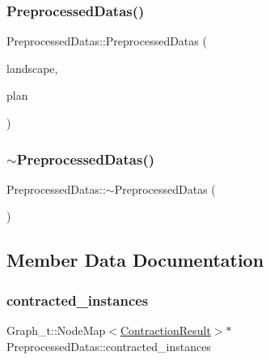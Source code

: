 \subsubsection{\texorpdfstring{Preprocessed\+Datas()}{PreprocessedDatas()}}
{\footnotesize\ttfamily Preprocessed\+Datas\+::\+Preprocessed\+Datas (\begin{DoxyParamCaption}\item[{const \hyperlink{class_landscape}{Landscape} \&}]{landscape,  }\item[{const \hyperlink{class_restoration_plan}{Restoration\+Plan} \&}]{plan }\end{DoxyParamCaption})\hspace{0.3cm}{\ttfamily [inline]}}

\mbox{\label{class_preprocessed_datas_a9bb50e07b35810a18b2a1890b5e456c1}} 
\subsubsection{\texorpdfstring{$\sim$\+Preprocessed\+Datas()}{~PreprocessedDatas()}}
{\footnotesize\ttfamily Preprocessed\+Datas\+::$\sim$\+Preprocessed\+Datas (\begin{DoxyParamCaption}{ }\end{DoxyParamCaption})\hspace{0.3cm}{\ttfamily [inline]}}



\subsection{Member Data Documentation}
\mbox{\label{class_preprocessed_datas_ab5f37f8788618675ab08bb46f8e5ac81}} 
\subsubsection{\texorpdfstring{contracted\+\_\+instances}{contracted\_instances}}
{\footnotesize\ttfamily Graph\+\_\+t\+::\+Node\+Map$<$\hyperlink{class_contraction_result}{Contraction\+Result}$>$$\ast$ Preprocessed\+Datas\+::contracted\+\_\+instances}

